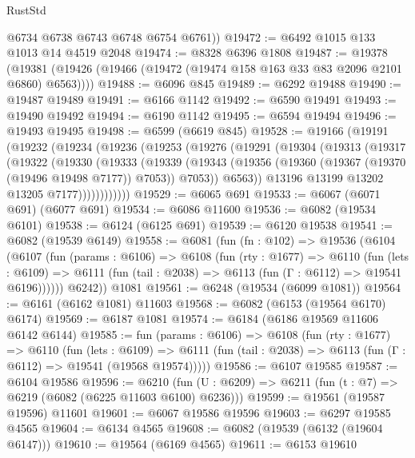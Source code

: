 \begin{lexlean}{RustStd}
\begin{coremodule}
        @6734
        @6738
        @6743
        @6748
        @6754
        @6761))
@19472 := @6492 @1015 @133 @1013 @14 @4519 @2048
@19474 := @8328 @6396 @1808
@19487 := @19378
    (@19381 (@19426 (@19466 (@19472 (@19474 @158 @163 @33 @83 @2096 @2101 @6860) @6563))))
@19488 := @6096 @845
@19489 := @6292 @19488
@19490 := @19487 @19489
@19491 := @6166 @1142
@19492 := @6590 @19491
@19493 := @19490 @19492
@19494 := @6190 @1142
@19495 := @6594 @19494
@19496 := @19493 @19495
@19498 := @6599 (@6619 @845)
@19528 := @19166
    (@19191
      (@19232
        (@19234
          (@19236
            (@19253
              (@19276
                (@19291
                  (@19304
                    (@19313
                      (@19317
                        (@19322
                          (@19330
                            (@19333
                              (@19339
                                (@19343
                                  (@19356
                                    (@19360 (@19367 (@19370 (@19496 @19498 @7177)) @7053))
                                    @7053))
                                @6563))
                            @13196
                            @13199
                            @13202
                            @13205
                            @7177))))))))))))
@19529 := @6065 @691
@19533 := @6067 (@6071 @691) (@6077 @691)
@19534 := @6086 @11600
@19536 := @6082 (@19534 @6101)
@19538 := @6124 (@6125 @691)
@19539 := @6120 @19538
@19541 := @6082 (@19539 @6149)
@19558 := @6081
    (fun (fn : @102) =>
    @19536
      (@6104
        (@6107
          (fun (params : @6106) =>
          @6108
            (fun (rty : @1677) =>
            @6110
              (fun (lets : @6109) =>
              @6111 (fun (tail : @2038) => @6113 (fun (Γ : @6112) => @19541 @6196))))))
        @6242))
    @1081
@19561 := @6248 (@19534 (@6099 @1081))
@19564 := @6161 (@6162 @1081) @11603
@19568 := @6082 (@6153 (@19564 @6170) @6174)
@19569 := @6187 @1081
@19574 := @6184 (@6186 @19569 @11606 @6142 @6144)
@19585 := fun (params : @6106) =>
  @6108
    (fun (rty : @1677) =>
    @6110
      (fun (lets : @6109) =>
      @6111 (fun (tail : @2038) => @6113 (fun (Γ : @6112) => @19541 (@19568 @19574)))))
@19586 := @6107 @19585
@19587 := @6104 @19586
@19596 := @6210
    (fun (U : @6209) => @6211 (fun (t : @7) => @6219 (@6082 (@6225 @11603 @6100) @6236)))
@19599 := @19561 (@19587 @19596) @11601
@19601 := @6067 @19586 @19596
@19603 := @6297 @19585 @4565
@19604 := @6134 @4565
@19608 := @6082 (@19539 (@6132 (@19604 @6147)))
@19610 := @19564 (@6169 @4565)
@19611 := @6153 @19610

\end{coremodule}
\end{lexlean}
